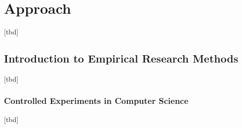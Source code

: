 \chapter{Approach}
\label{chapter:approach}

[tbd]









\section{Introduction to Empirical Research Methods}

[tbd]















\subsection{Controlled Experiments in Computer Science}

[tbd]




